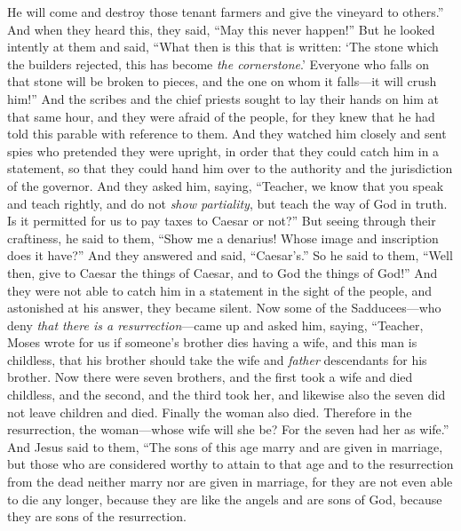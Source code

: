 \begin{biblechapter}
\verse He will come and destroy those tenant farmers and give the vineyard to others.” And when they heard this, they said, “May this never happen!”
\verse But he looked intently at them and said, “What then is this that is written: ‘The stone which the builders rejected, 
this has become \textit{the cornerstone}.’
\verse Everyone who falls on that stone will be broken to pieces, and the one on whom it falls—it will crush him!”
\verse And the scribes and the chief priests sought to lay their hands on him at that same hour, and they were afraid of the people, for they knew that he had told this parable with reference to them.
 And they watched him closely and sent spies who pretended they were upright, in order that they could catch him in a statement, so that they could hand him over to the authority and the jurisdiction of the governor.
\verse And they asked him, saying, “Teacher, we know that you speak and teach rightly, and do not \textit{show partiality}, but teach the way of God in truth.
\verse Is it permitted for us to pay taxes to Caesar or not?”
\verse But seeing through their craftiness, he said to them,
\verse “Show me a denarius! Whose image and inscription does it have?” And they answered and said, “Caesar’s.”
\verse So he said to them, “Well then, give to Caesar the things of Caesar, and to God the things of God!”
\verse And they were not able to catch him﻿ in a statement in the sight of the people, and astonished at his answer, they became silent.
 Now some of the Sadducees—who deny \textit{that there is a resurrection}—came up and asked him,
\verse saying, “Teacher, Moses wrote for us if someone’s brother dies having a wife, and this man is childless, that his brother should take the wife and \textit{father} descendants for his brother.
\verse Now there were seven brothers, and the first took a wife and died childless,
\verse and the second,
\verse and the third took her, and likewise also the seven did not leave children and died.
\verse Finally the woman also died.
\verse Therefore in the resurrection, the woman—whose wife will she be? For the seven had her as wife.”
\verse And Jesus said to them, “The sons of this age marry and are given in marriage,
\verse but those who are considered worthy to attain to that age and to the resurrection from the dead neither marry nor are given in marriage,
\verse for they are not even able to die any longer, because they are like the angels and are sons of God, because they are sons of the resurrection.

\end{biblechapter}
